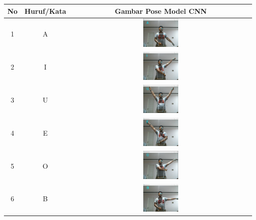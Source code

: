 \begin{table}[!hbt]
	\centering
	\label{tbl:Tabel Contoh Huruf/Kata dan Gambar Pose Model CNN Orang Pertama}
	\begin{tabular}{|c|c|c|}
	\hline
	No & Huruf/Kata & Gambar Pose Model CNN \\
	\hline
	1 & A & \includegraphics[width=0.2\textwidth]{gambar/bener/HurufA_ModelCNN_Dawe.png} \\
	\hline
	2 & I & \includegraphics[width=0.2\textwidth]{gambar/bener/HurufI_ModelCNN_Dawe.png} \\
	\hline
	3 & U & \includegraphics[width=0.2\textwidth]{gambar/bener/HurufU_ModelCNN_Dawe.png} \\
	\hline
	4 & E & \includegraphics[width=0.2\textwidth]{gambar/bener/HurufE_ModelCNN_Dawe.png} \\
	\hline
	5 & O & \includegraphics[width=0.2\textwidth]{gambar/bener/HurufO_ModelCNN_Dawe.png} \\
	\hline
	6 & B & \includegraphics[width=0.2\textwidth]{gambar/bener/HurufB_ModelCNN_Dawe.png} \\

\end{tabular}
\end{table}
